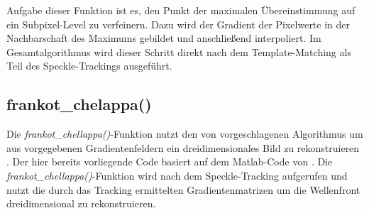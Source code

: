 Aufgabe dieser Funktion ist es, den Punkt der maximalen Übereinstimmung auf ein Subpixel-Level zu verfeinern. Dazu wird der Gradient der Pixelwerte in der Nachbarschaft des Maximums gebildet und anschließend interpoliert. Im Gesamtalgorithmus wird dieser Schritt direkt nach dem Template-Matching als Teil des Speckle-Trackings ausgeführt.

\subsection{frankot\_chelappa()}

Die \textit{frankot\_chellappa()}-Funktion nutzt den von \citeauthor{FC88} vorgeschlagenen Algorithmus um aus vorgegebenen Gradientenfeldern ein dreidimensionales Bild zu rekonstruieren \cite{FC88}. Der hier bereits vorliegende Code basiert auf dem Matlab-Code von \citeauthor{Kov04} \cite{Kov04}. Die \textit{frankot\_chellappa()}-Funktion wird nach dem Speckle-Tracking aufgerufen und nutzt die durch das Tracking ermittelten Gradientenmatrizen um die Wellenfront dreidimensional zu rekonstruieren. 